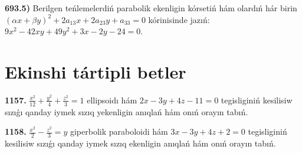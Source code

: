 \textbf{693.5)} Berilgen teńlemelerdiń parabolik ekenligin kórsetiń hám olardıń hár birin $(\alpha x+\beta y)^2+2 a_{13} x+2 a_{23} y+a_{33}=0$ kórinisinde jazıń:  $9 x^2-42 x y+49 y^2+3 x-2 y-24=0$.



\section{ Ekinshi tártipli betler}



\textbf{1157.} $\frac{x^2}{12}+\frac{y^2}{4}+\frac{z^2}{3}=1$ ellipsoidı hám $2x-3y+4z-11=0$ tegisliginiń kesilisiw sızıǵı qanday iymek sızıq yekenligin anıqlań hám onıń orayın tabıń.

\textbf{1158.} $\frac{x^2}{2}-\frac{z^2}{3}=y$ giperbolik paraboloidi hám $3x-3y+4z+2=0$ tegisliginiń kesilisiw sızıǵı qanday iymek sızıq ekenligin anıqlań hám onıń orayın tabıń.

